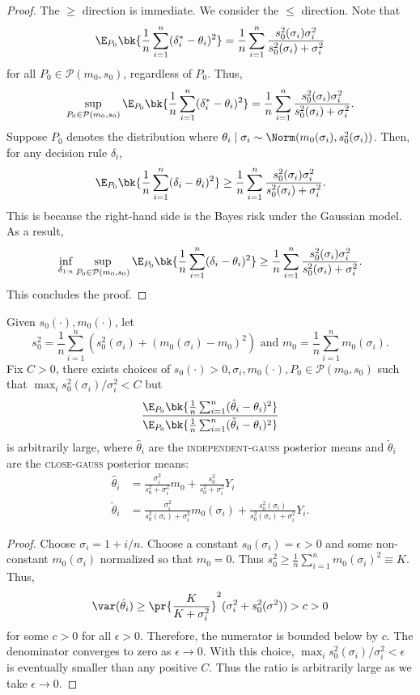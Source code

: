 \documentclass[12pt, reqno]{amsart}
\newcommand{\close}{\textsc{close}}
\newcommand{\closegauss}{\close-\textsc{gauss}}
\newcommand{\indepgauss}{\textsc{independent-gauss}}
\numberwithin{equation}{section}
\begin{document}
\begin{refsection}
\begin{appendices}
\begin{proof}
The $\ge$ direction is immediate. We consider the $\le$ direction. 
Note that \[
\E_{P_0}\bk{
  \frac{1}{n} \sum_{i=1}^n (\delta_i^* - \theta_i)^2
}  = \frac{1}{n} \sum_{i=1}^n \frac{s_0^2(\sigma_i) \sigma_i^2 }{s_0^2(\sigma_i) +
\sigma_i^2}
\]
for all $P_0 \in \mathcal P(m_0, s_0)$, regardless of $P_0$. Thus, 
\[
\sup_{P_0 \in \mathcal P(m_0, s_0)} \E_{P_0}\bk{
  \frac{1}{n} \sum_{i=1}^n (\delta_i^* - \theta_i)^2
} = \frac{1}{n} \sum_{i=1}^n \frac{s_0^2(\sigma_i) \sigma_i^2 }{s_0^2(\sigma_i) +
\sigma_i^2}.
\]
Suppose $P_0$ denotes the distribution where $\theta_i \mid \sigma_i \sim \Norm(m_0
(\sigma_i), s_0^2(\sigma_i))$. Then, for any decision rule $\delta_i$, \[
\E_{P_0}\bk{\frac{1}{n} \sum_{i=1}^n (\delta_i - \theta_i)^2} \ge\frac{1}{n} \sum_{i=1}^n \frac{s_0^2(\sigma_i) \sigma_i^2 }{s_0^2(\sigma_i) +
\sigma_i^2}.
\]
This is because the right-hand side is the Bayes risk under the Gaussian model. As a
result, \[
\inf_{\delta_{1:n}} \sup_{P_0 \in \mathcal P(m_0, s_0)} \E_{P_0}\bk{
  \frac{1}{n} \sum_{i=1}^n (\delta_i - \theta_i)^2
} \ge 
\frac{1}{n} \sum_{i=1}^n \frac{s_0^2(\sigma_i) \sigma_i^2 }{s_0^2(\sigma_i) +
\sigma_i^2}.
\]
This concludes the proof.
\end{proof}

\begin{lemma}
\label{lemma:indepgauss_not_bounded}
Given $s_0(\cdot), m_0(\cdot)$, let \[
s_0^2 = \frac{1}{n} \sum_{i=1}^n (s_0^2(\sigma_i) + (m_0(\sigma_i) - m_0)^2)
\text{ and }
m_0 = \frac{1}{n} \sum_{i=1}^n m_0(\sigma_i).
\]
Fix $C > 0$, there exists choices of $s_0(\cdot) > 0, \sigma_i, m_0(\cdot), P_0 \in
\mathcal
P(m_0, s_0)$ such that $\max_i
s_0^2
(\sigma_i) / \sigma_i^2 < C$ but \[
\frac{\E_{P_0}\bk{
  \frac{1}{n} \sum_{i=1}^n (\hat\theta_i - \theta_i)^2
}}{
  \E_{P_0}\bk{
  \frac{1}{n} \sum_{i=1}^n (\check\theta_i - \theta_i)^2
}
}
\]
is arbitrarily large, where $\hat\theta_i$ are the \indepgauss{} posterior means and
$\check\theta_i$ are the \closegauss{} posterior means: \begin{align*}
\hat\theta_i &= \frac{\sigma_i^2}{s_0^2 + \sigma_i^2} m_0 + \frac{s_0^2}{s_0^2 +
\sigma_i^2} Y_i \\
\check\theta_i &= \frac{\sigma_i^2}{s_0^2(\sigma_i) + \sigma_i^2} m_0(\sigma_i) + 
\frac{s_0^2 (\sigma_i) }{s_0^2(\sigma_i)
+
\sigma_i^2} Y_i.
\end{align*}
\end{lemma}
\begin{proof}
Choose $\sigma_i = 1 + i/n$. Choose a constant $s_0(\sigma_i) = \epsilon>0$ and some
non-constant $m_0
(\sigma_i)$ normalized so that $m_0 = 0$. Thus $s_0^2 \ge \frac{1}{n} \sum_{i=1}^n m_0
(\sigma_i)^2 \equiv K$. Thus, \[
\var(\hat\theta_i) \ge \pr{\frac{K}{K+\sigma_i^2}}^2 (\sigma_i^2 + s_0^2(\sigma^2)) > c >
0
\] for some $c >0$ for all $\epsilon > 0$. Therefore, the numerator is bounded below by
 $c$. The denominator converges to zero as $\epsilon \to 0$. With this choice, $\max_i
 s_0^2(\sigma_i)/\sigma_i^2 < \epsilon$ is eventually smaller than any positive $C$. Thus
 the ratio is arbitrarily large as we take $\epsilon \to 0$. 
\end{proof}



\end{appendices}
\end{refsection}
\end{document}

